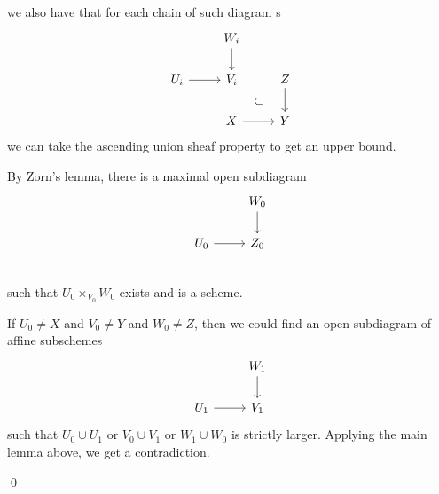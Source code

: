 \documentclass[x11names,reqno,14pt]{extarticle}
\begin{document}
we also have that for each chain of such diagram s
\[
\begin{tikzcd}
& W_i \ar[d] & \\
U_i \ar[r] & V_i \ar[dr, phantom, "\subset"] & Z \ar[d] \\
& X\ar[r] & Y
\end{tikzcd}
\]
we can take the ascending union sheaf property to get an upper bound. 

By Zorn's lemma, there is a maximal open subdiagram 
\[
\begin{tikzcd}
& W_0 \ar[d] \\
U_0 \ar[r] & Z_0\\
\end{tikzcd}
\]
such that $U_0\times_{V_0}W_0$ exists and is a scheme. 

If $U_0\neq X$ and $V_0 \neq Y$ and $W_0\neq Z$, then we could find an open subdiagram of affine subschemes
\[
\begin{tikzcd}
& W_1 \ar[d] \\
U_1 \ar[r] & V_1
\end{tikzcd}
\]
such that $U_0 \cup U_1$ or $V_0 \cup V_1$ or $W_1 \cup W_0$ is strictly larger. Applying the main lemma above, we get a contradiction. 

\qed
\end{document}
